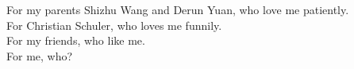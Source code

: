 \thispagestyle{empty}
{}

\vspace*{3cm}

\begin{center}
    For my parents Shizhu Wang and Derun Yuan, who love me patiently. \\ \medskip
    For Christian Schuler, who loves me funnily. \\ \medskip
    For my friends, who like me. \\\medskip
    For me, who?  
\end{center}
